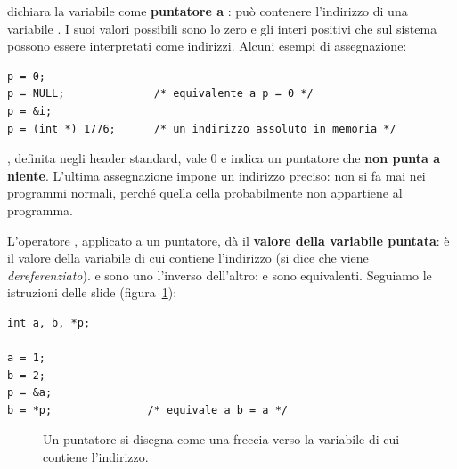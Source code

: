 dichiara la variabile  come \textbf{puntatore a }: può
contenere l'indirizzo di una variabile . I suoi valori possibili
sono lo zero e gli interi positivi che sul sistema possono essere
interpretati come indirizzi. Alcuni esempi di assegnazione:

\begin{lstlisting}[style=c]
p = 0;
p = NULL;              /* equivalente a p = 0 */
p = &i;
p = (int *) 1776;      /* un indirizzo assoluto in memoria */
\end{lstlisting}

, definita negli header standard, vale 0 e indica un puntatore
che \textbf{non punta a niente}. L'ultima assegnazione impone un indirizzo
preciso: non si fa mai nei programmi normali, perché quella cella
probabilmente non appartiene al programma.

L'operatore \code{*}, applicato a un puntatore, dà il \textbf{valore della
variabile puntata}:  è il valore della variabile di cui 
contiene l'indirizzo (si dice che  viene \textit{dereferenziato}).
\code{*} e \code{\&} sono uno l'inverso dell'altro:  e 
sono equivalenti. Seguiamo le istruzioni delle slide
(figura~\ref{fig:puntatore}):

\begin{lstlisting}[style=c]
int a, b, *p;

a = 1;
b = 2;
p = &a;
b = *p;               /* equivale a b = a */
\end{lstlisting}

\begin{figure}[H]
  \centering
  \caption{Un puntatore si disegna come una freccia verso la variabile di
           cui contiene l'indirizzo.}
  \label{fig:puntatore}
\end{figure}

